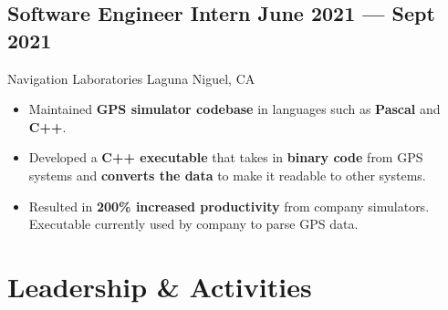 \documentclass[a4,10pt]{article}
\newcommand{\subtext}[1]{
#1\par\vspace{-0.2cm}}
\newenvironment{zitemize}{
\begin{itemize}\itemsep0pt \parskip0pt \parsep1pt}
{\end{itemize}\vspace{-0.5cm}}
\begin{document}
\subsection*{Software Engineer Intern \hfill June 2021 --- Sept 2021} 
\subtext{Navigation Laboratories \hfill Laguna Niguel, CA}
\vspace{-.1cm}
    \begin{zitemize}
        \item Maintained \textbf{GPS simulator codebase} in languages such as \textbf{Pascal} and \textbf{C++}.
        \item Developed a \textbf{C++ executable} that takes in \textbf{binary code} from GPS systems and \textbf{converts the data} to make it readable to other systems.
        \item Resulted in \textbf{200\% increased productivity} from company simulators. Executable currently used by company to parse GPS data.
    \end{zitemize}

\section{Leadership \& Activities}

        

\end{document}
